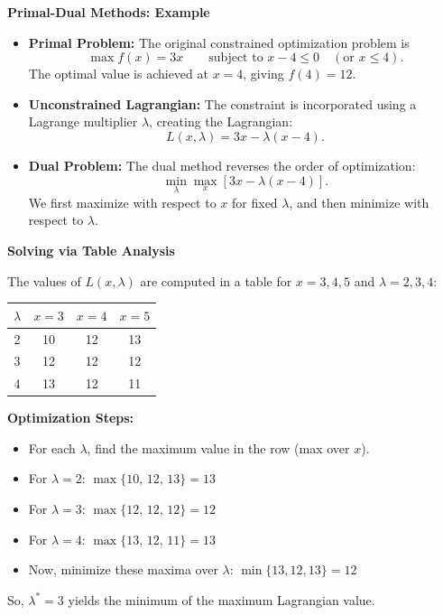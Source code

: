 \documentclass[12pt]{article}
\begin{document}
\textbf{Primal-Dual Methods: Example}

\begin{itemize}
    \item \textbf{Primal Problem:}  
    The original constrained optimization problem is
    $$
    \max f(x) = 3x \qquad \text{subject to } x - 4 \leq 0 \quad (\text{or } x \leq 4).
    $$
    The optimal value is achieved at $x=4$, giving $f(4) = 12$.

    \item \textbf{Unconstrained Lagrangian:}  
    The constraint is incorporated using a Lagrange multiplier $\lambda$, creating the Lagrangian:
    $$
    L(x, \lambda) = 3x - \lambda(x - 4).
    $$

    \item \textbf{Dual Problem:}  
    The dual method reverses the order of optimization:
    $$
    \min_{\lambda} \max_{x} \left[ 3x - \lambda(x - 4) \right].
    $$
    We first maximize with respect to $x$ for fixed $\lambda$, and then minimize with respect to $\lambda$.
\end{itemize}

\textbf{Solving via Table Analysis}

The values of $L(x, \lambda)$ are computed in a table for $x = 3, 4, 5$ and $\lambda = 2, 3, 4$:

\begin{center}
\begin{tabular}{c|ccc}
$\lambda$ & $x = 3$ & $x = 4$ & $x = 5$ \\
\hline
2 & 10 & 12 & 13 \\
3 & 12 & 12 & 12 \\
4 & 13 & 12 & 11 \\
\end{tabular}
\end{center}

\vspace{1em}
\textbf{Optimization Steps:}
\begin{itemize}
    \item For each $\lambda$, find the maximum value in the row (max over $x$).
    \item For $\lambda = 2$: $\max \{10, \, 12, \, 13\} = 13$
    \item For $\lambda = 3$: $\max \{12, \, 12, \, 12\} = 12$
    \item For $\lambda = 4$: $\max \{13, \, 12, \, 11\} = 13$
    \item Now, minimize these maxima over $\lambda$: $\min \{13, 12, 13\} = 12$
\end{itemize}
So, $\lambda^* = 3$ yields the minimum of the maximum Lagrangian value. \\ 
\end{document}
